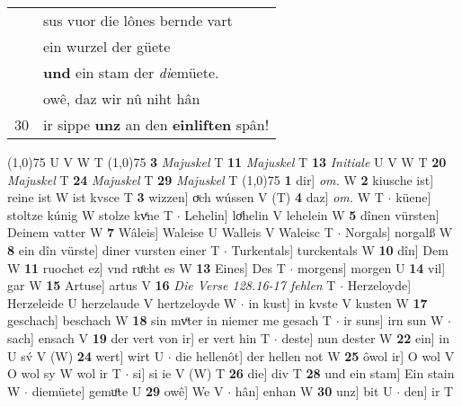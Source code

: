 \documentclass[8pt,a4paper,notitlepage]{article}
\begin{document}
\begin{table}[ht]
\begin{minipage}[t]{0.5\linewidth}
\begin{tabular}{rl}
 & sus vuor die lônes bernde vart\\ 
 & ein wurzel der güete\\ 
 & \textbf{und} ein stam der \textit{di}emüete.\\ 
 & owê, daz wir nû niht hân\\ 
30 & ir sippe \textbf{unz} an den \textbf{einliften} spân!\\ 
\end{tabular}
\scriptsize
\line(1,0){75} \newline
U V W T \newline
\line(1,0){75} \newline
\textbf{3} \textit{Majuskel} T  \textbf{11} \textit{Majuskel} T  \textbf{13} \textit{Initiale} U V W T  \textbf{20} \textit{Majuskel} T  \textbf{24} \textit{Majuskel} T  \textbf{29} \textit{Majuskel} T  \newline
\line(1,0){75} \newline
\textbf{1} dir] \textit{om.} W \textbf{2} kiusche ist] reine ist W ist kvsce T \textbf{3} wizzen] oͮch wússen V (T) \textbf{4} daz] \textit{om.} W T  $\cdot$ küene] stoltze kúnig W stolze kvͤne T  $\cdot$ Lehelin] loͤhelin V lehelein W \textbf{5} dînen vürsten] Deinem vatter W \textbf{7} Wâleis] Waleise U Walleis V Waleisc T  $\cdot$ Norgals] norgalß W \textbf{8} ein dîn vürste] diner vursten einer T  $\cdot$ Turkentals] turckentals W \textbf{10} dîn] Dem W \textbf{11} ruochet ez] vnd ruͦcht es W \textbf{13} Eines] Des T  $\cdot$ morgens] morgen U \textbf{14} vil] gar W \textbf{15} Artuse] artus V \textbf{16} \textit{Die Verse 128.16-17 fehlen} T   $\cdot$ Herzeloyde] Herzeleide U herzelaude V hertzeloyde W  $\cdot$ in kust] in kvste V kusten W \textbf{17} geschach] beschach W \textbf{18} sin mvͦter in niemer me gesach T  $\cdot$ ir suns] irn sun W  $\cdot$ sach] ensach V \textbf{19} der vert von ir] er vert hin T  $\cdot$ deste] nun dester W \textbf{22} ein] in U sv́ V (W) \textbf{24} wert] wirt U  $\cdot$ die hellenôt] der hellen not W \textbf{25} ôwol ir] O wol V O wol sy W wol ir T  $\cdot$ si] si ie V (W) T \textbf{26} die] div T \textbf{28} und ein stam] Ein stain W  $\cdot$ diemüete] gemuͦte U \textbf{29} owê] We V  $\cdot$ hân] enhan W \textbf{30} unz] bit U  $\cdot$ den] ir T \newline
\end{minipage}
\end{table}
\end{document}
